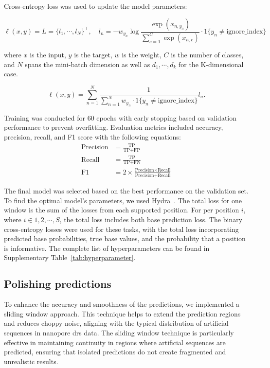 \documentclass[pdflatex, sn-mathphys-num, lineno]{sn-jnl}%
\theoremstyle{thmstyleone}%
\theoremstyle{thmstyletwo}%
\theoremstyle{thmstylethree}%
\begin{document}
Cross-entropy loss was used to update the model parameters:

\[
	\ell(x, y) = L = \{l_1,\cdots,l_N\}^\top, \quad
	l_n = - w_{y_n} \log \frac{\exp(x_{n,y_n})}{\sum_{c=1}^C \exp(x_{n,c})}
	\cdot 1\{y_n \not= \textrm{ignore\_index}\}
\]

where \( x \) is the input, \( y \) is the target, \( w \) is the weight,
\( C \) is the number of classes, and \( N \) spans the mini-batch dimension as well as
\( d_1, \cdots, d_k \) for the K-dimensional case.

\[
	\ell(x, y) =   \sum_{n=1}^N \frac{1}{\sum_{n=1}^N w_{y_n} \cdot 1\{y_n \not= \textrm{ignore\_index}\}} l_n
	.\]

Training was conducted for \num{60} epochs with early stopping based on validation performance to prevent overfitting.
Evaluation metrics included accuracy, precision, recall, and F1 score with the following equations:
\begin{align*}
	\textrm{Precision} & = \frac{\textrm{TP}}{\textrm{TP}+\textrm{FP}}                                                     \\
	\textrm{Recall}    & = \frac{\textrm{TP}}{\textrm{TP}+\textrm{FN}}                                                     \\
	\textrm{F1}        & = 2 \times \frac{\textrm{Precision} \times \textrm{Recall}}{\textrm{Precision} + \textrm{Recall}}
\end{align*}

The final model was selected based on the best performance on the validation set.
To find the optimal model's parameters, we used Hydra~\cite{Yadan2019Hydra}.
The total loss for one window is the sum of the losses from each supported position.
For per position  \( i \), where \( i  \in {1, 2, \cdots, S} \),  the total loss includes both base prediction loss.
The binary cross-entropy losses were used for these tasks, with the total loss incorporating predicted base probabilities, true base values, and the probability that a position is informative.
The complete list of hyperparameters can be found in Supplementary Table~\ref{tab:hyperparameter}.

\subsection{Polishing predictions}

To enhance the accuracy and smoothness of the predictions, we implemented a sliding window approach.
This technique helps to extend the prediction regions and reduces choppy noise, aligning with the typical distribution of artificial sequences in nanopore \gls{drs} data.
The sliding window technique is particularly effective in maintaining continuity in regions where artificial sequences are predicted, ensuring that isolated predictions do not create fragmented and unrealistic results.
\end{document}
